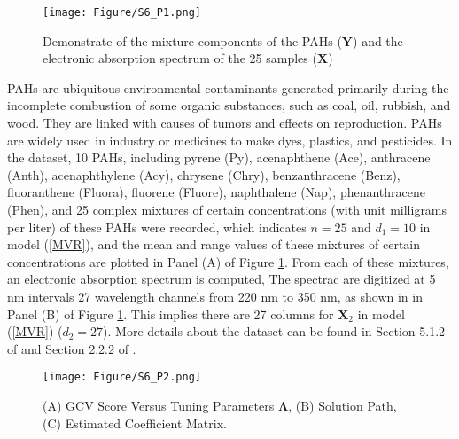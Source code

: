 \documentclass[12pt]{article}
\begin{document}
\begin{figure} [hbt!]
    \centering
    \texttt{[image: Figure/S6\_P1.png]} 
    \caption{Demonstrate of the mixture components of the PAHs ($\boldsymbol{Y}$) and the electronic absorption spectrum of the 25 samples ($\boldsymbol{X}$)}
    \label{fig:Realdata_XY}
\end{figure}

PAHs are ubiquitous environmental contaminants generated primarily during the incomplete combustion of some organic substances, such as coal, oil, rubbish, and wood. They are linked with causes of tumors and effects on reproduction. PAHs are widely used in industry or medicines to make dyes, plastics, and pesticides. In the dataset, 10 PAHs, including pyrene (Py), acenaphthene (Ace), anthracene (Anth), acenaphthylene (Acy), chrysene (Chry), benzanthracene (Benz), fluoranthene (Fluora), fluorene (Fluore), naphthalene (Nap), phenanthracene (Phen), and 25 complex mixtures of certain concentrations (with unit milligrams per liter) of these PAHs were recorded, which indicates $n = 25$ and $d_{1} = 10$ in model (\ref{MVR}), and the mean and range values of these mixtures of certain concentrations are plotted in Panel (A) of Figure \ref{fig:Realdata_XY}. 
From each of these mixtures, an electronic absorption spectrum is computed, The spectrac are digitized at 5 nm intervals 27 wavelength channels from 220 nm to 350 nm, as shown in in Panel (B) of Figure \ref{fig:Realdata_XY}. 
This implies there are 27 columns for $\boldsymbol{X}_{2}$ in model (\ref{MVR}) ($d_{2}  = 27$). More details about the dataset can be found in Section 5.1.2 of \citet{brereton2003chemometrics} and Section 2.2.2 of \citet{isenmann2008modern}.

\begin{figure}[hbt!]
    \centering
    \texttt{[image: Figure/S6\_P2.png]}
    \caption{(A) GCV Score Versus Tuning Parameters $\boldsymbol{\Lambda}$, (B) Solution Path, (C) Estimated Coefficient Matrix.}
    \label{fig:Realdata_GCV}
\end{figure}
\end{document}
